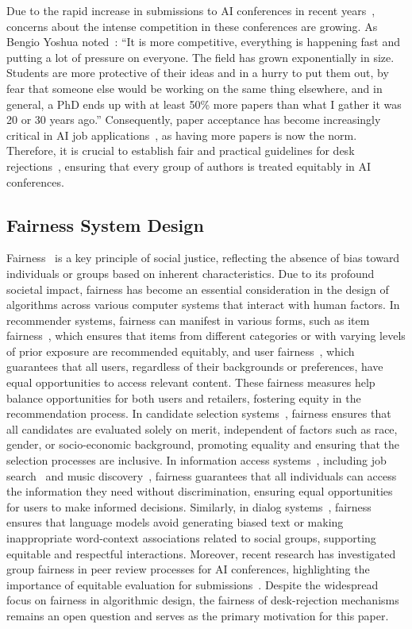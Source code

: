 Due to the rapid increase in submissions to AI conferences in recent years~\cite{stanford_ai_index}, concerns about the intense competition in these conferences are growing. As Bengio Yoshua noted~\cite{b20blog}: ``It is more competitive, everything is happening fast and putting a lot of pressure on everyone. The field has grown exponentially in size. Students are more protective of their ideas and in a hurry to put them out, by fear that someone else would be working on the same thing elsewhere, and in general, a PhD ends up with at least 50\% more papers than what I gather it was 20 or 30 years ago.'' Consequently, paper acceptance has become increasingly critical in AI job applications~\cite{a22, bbm+24}, as having more papers is now the norm. Therefore, it is crucial to establish fair and practical guidelines for desk rejections~\cite{takb18}, ensuring that every group of authors is treated equitably in AI conferences. 



\subsection{Fairness System Design}

Fairness~\cite{f12, mms+21} is a key principle of social justice, reflecting the absence of bias toward individuals or groups based on inherent characteristics. Due to its profound societal impact, fairness has become an essential consideration in the design of algorithms across various computer systems that interact with human factors. In recommender systems, fairness can manifest in various forms, such as item fairness~\cite{zfh+21, glg+21}, which ensures that items from different categories or with varying levels of prior exposure are recommended equitably, and user fairness~\cite{lcf+21, lcx+21}, which guarantees that all users, regardless of their backgrounds or preferences, have equal opportunities to access relevant content. These fairness measures help balance opportunities for both users and retailers, fostering equity in the recommendation process. In candidate selection systems~\cite{g93, whz20}, fairness ensures that all candidates are evaluated solely on merit, independent of factors such as race, gender, or socio-economic background, promoting equality and ensuring that the selection processes are inclusive. In information access systems~\cite{edb+22}, including job search~\cite{wmm+22} and music discovery~\cite{mrp+21}, fairness guarantees that all individuals can access the information they need without discrimination, ensuring equal opportunities for users to make informed decisions. Similarly, in dialog systems~\cite{gya22,grb+24}, fairness ensures that language models avoid generating biased text or making inappropriate word-context associations related to social groups, supporting equitable and respectful interactions. Moreover, recent research has investigated group fairness in peer review processes for AI conferences, highlighting the importance of equitable evaluation for submissions~\cite{ams23}.
Despite the widespread focus on fairness in algorithmic design, the fairness of desk-rejection mechanisms remains an open question and serves as the primary motivation for this paper.